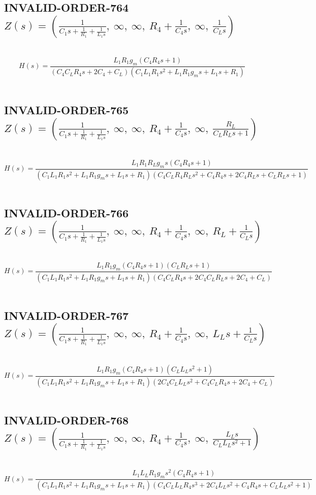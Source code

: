 \documentclass{article}
\begin{document}
\subsection{INVALID-ORDER-764 $Z(s) = \left( \frac{1}{C_{1} s + \frac{1}{R_{1}} + \frac{1}{L_{1} s}}, \  \infty, \  \infty, \  R_{4} + \frac{1}{C_{4} s}, \  \infty, \  \frac{1}{C_{L} s}\right)$ } \ 
\textbf{\[H(s) = \frac{L_{1} R_{1} g_{m} \left(C_{4} R_{4} s + 1\right)}{\left(C_{4} C_{L} R_{4} s + 2 C_{4} + C_{L}\right) \left(C_{1} L_{1} R_{1} s^{2} + L_{1} R_{1} g_{m} s + L_{1} s + R_{1}\right)}\] } \ 
\subsection{INVALID-ORDER-765 $Z(s) = \left( \frac{1}{C_{1} s + \frac{1}{R_{1}} + \frac{1}{L_{1} s}}, \  \infty, \  \infty, \  R_{4} + \frac{1}{C_{4} s}, \  \infty, \  \frac{R_{L}}{C_{L} R_{L} s + 1}\right)$ } \ 
\textbf{\[H(s) = \frac{L_{1} R_{1} R_{L} g_{m} s \left(C_{4} R_{4} s + 1\right)}{\left(C_{1} L_{1} R_{1} s^{2} + L_{1} R_{1} g_{m} s + L_{1} s + R_{1}\right) \left(C_{4} C_{L} R_{4} R_{L} s^{2} + C_{4} R_{4} s + 2 C_{4} R_{L} s + C_{L} R_{L} s + 1\right)}\] } \ 
\subsection{INVALID-ORDER-766 $Z(s) = \left( \frac{1}{C_{1} s + \frac{1}{R_{1}} + \frac{1}{L_{1} s}}, \  \infty, \  \infty, \  R_{4} + \frac{1}{C_{4} s}, \  \infty, \  R_{L} + \frac{1}{C_{L} s}\right)$ } \ 
\textbf{\[H(s) = \frac{L_{1} R_{1} g_{m} \left(C_{4} R_{4} s + 1\right) \left(C_{L} R_{L} s + 1\right)}{\left(C_{1} L_{1} R_{1} s^{2} + L_{1} R_{1} g_{m} s + L_{1} s + R_{1}\right) \left(C_{4} C_{L} R_{4} s + 2 C_{4} C_{L} R_{L} s + 2 C_{4} + C_{L}\right)}\] } \ 
\subsection{INVALID-ORDER-767 $Z(s) = \left( \frac{1}{C_{1} s + \frac{1}{R_{1}} + \frac{1}{L_{1} s}}, \  \infty, \  \infty, \  R_{4} + \frac{1}{C_{4} s}, \  \infty, \  L_{L} s + \frac{1}{C_{L} s}\right)$ } \ 
\textbf{\[H(s) = \frac{L_{1} R_{1} g_{m} \left(C_{4} R_{4} s + 1\right) \left(C_{L} L_{L} s^{2} + 1\right)}{\left(C_{1} L_{1} R_{1} s^{2} + L_{1} R_{1} g_{m} s + L_{1} s + R_{1}\right) \left(2 C_{4} C_{L} L_{L} s^{2} + C_{4} C_{L} R_{4} s + 2 C_{4} + C_{L}\right)}\] } \ 
\subsection{INVALID-ORDER-768 $Z(s) = \left( \frac{1}{C_{1} s + \frac{1}{R_{1}} + \frac{1}{L_{1} s}}, \  \infty, \  \infty, \  R_{4} + \frac{1}{C_{4} s}, \  \infty, \  \frac{L_{L} s}{C_{L} L_{L} s^{2} + 1}\right)$ } \ 
\textbf{\[H(s) = \frac{L_{1} L_{L} R_{1} g_{m} s^{2} \left(C_{4} R_{4} s + 1\right)}{\left(C_{1} L_{1} R_{1} s^{2} + L_{1} R_{1} g_{m} s + L_{1} s + R_{1}\right) \left(C_{4} C_{L} L_{L} R_{4} s^{3} + 2 C_{4} L_{L} s^{2} + C_{4} R_{4} s + C_{L} L_{L} s^{2} + 1\right)}\] } \ 
\end{document}
